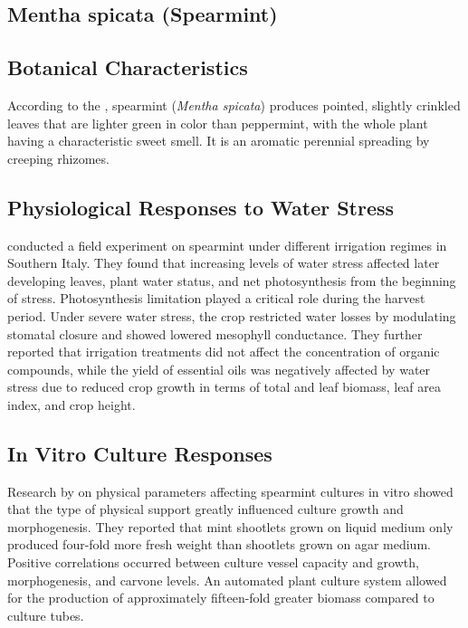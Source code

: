 \subsection{Mentha spicata (Spearmint)}

\subsection*{Botanical Characteristics}
According to the \textcite{rhs2026spicata}, spearmint (\textit{Mentha spicata}) produces pointed, slightly crinkled leaves that are lighter green in color than peppermint, with the whole plant having a characteristic sweet smell. It is an aromatic perennial spreading by creeping rhizomes.

\subsection*{Physiological Responses to Water Stress}
\textcite{marino2019evaluation} conducted a field experiment on spearmint under different irrigation regimes in Southern Italy. They found that increasing levels of water stress affected later developing leaves, plant water status, and net photosynthesis from the beginning of stress. Photosynthesis limitation played a critical role during the harvest period. Under severe water stress, the crop restricted water losses by modulating stomatal closure and showed lowered mesophyll conductance. They further reported that irrigation treatments did not affect the concentration of organic compounds, while the yield of essential oils was negatively affected by water stress due to reduced crop growth in terms of total and leaf biomass, leaf area index, and crop height.

\subsection*{In Vitro Culture Responses}
Research by \textcite{tisserat2004influence} on physical parameters affecting spearmint cultures in vitro showed that the type of physical support greatly influenced culture growth and morphogenesis. They reported that mint shootlets grown on liquid medium only produced four-fold more fresh weight than shootlets grown on agar medium. Positive correlations occurred between culture vessel capacity and growth, morphogenesis, and carvone levels. An automated plant culture system allowed for the production of approximately fifteen-fold greater biomass compared to culture tubes.

